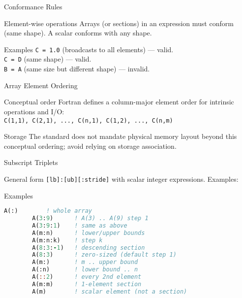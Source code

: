 
\begin{frame}{Conformance Rules}
  \begin{block}{Element-wise operations}
    Arrays (or sections) in an expression must conform (same shape). A scalar conforms with any shape.
  \end{block}
  \begin{block}{Examples}
    \texttt{C = 1.0} (broadcasts to all elements) — valid.\\
    \texttt{C = D} (same shape) — valid.\\
    \texttt{B = A} (same size but different shape) — invalid.
  \end{block}
\end{frame}

\begin{frame}{Array Element Ordering}
  \begin{block}{Conceptual order}
    Fortran defines a column-major element order for intrinsic operations and I/O:\\
    \texttt{C(1,1), C(2,1), ..., C(n,1), C(1,2), ..., C(n,m)}
  \end{block}
  \begin{block}{Storage}
    The standard does not mandate physical memory layout beyond this conceptual ordering; avoid relying on storage association.
  \end{block}
\end{frame}



\begin{frame}[fragile]{Subscript Triplets}
	\begin{block}{General form}
		\texttt{[lb]:[ub][:stride]} with scalar integer expressions. Examples:
	\end{block}
	\begin{block}{Examples}
		\begin{lstlisting}[language=Fortran]
		A(:)        ! whole array
		A(3:9)      ! A(3) .. A(9) step 1
		A(3:9:1)    ! same as above
		A(m:n)      ! lower/upper bounds
		A(m:n:k)    ! step k
		A(8:3:-1)   ! descending section
		A(8:3)      ! zero-sized (default step 1)
		A(m:)       ! m .. upper bound
		A(:n)       ! lower bound .. n
		A(::2)      ! every 2nd element
		A(m:m)      ! 1-element section
		A(m)        ! scalar element (not a section)
		\end{lstlisting}
	\end{block}
\end{frame}



